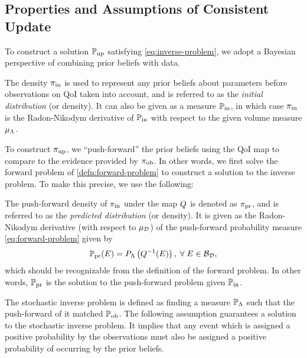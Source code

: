 \subsection{Properties and Assumptions of Consistent Update}\label{sec:properties}

To construct a solution $\operatorname*{\mathbb{P}_{up}}$ satisfying \eqref{eq:inverse-problem}, we adopt a Bayesian perspective of combining prior beliefs with data. 

\begin{defn}\label{defn:initial}
  The density $\operatorname*{\pi_{in}}$ is used to represent any prior beliefs about parameters before observations on QoI taken into account, and is referred to as the \emph{initial distribution} (or density).
  It can also be given as a measure $\operatorname*{\mathbb{P}_{in}}$, in which case $\operatorname*{\pi_{in}}$ is the Radon-Nikodym derivative of $\operatorname*{\mathbb{P}_{in}}$ with respect to the given volume measure $\mu_{{\Lambda}}$. 
\end{defn}

To construct $\operatorname*{\pi_{up}}$, we ``push-forward'' the prior beliefs using the QoI map to compare to the evidence provided by $\operatorname*{\pi_{ob}}$. 
In other words, we first solve the forward problem of \eqref{defn:forward-problem} to construct a solution to the inverse problem. 
To make this precise, we use the following:

\begin{defn}\label{defn:predicted}
  The push-forward density of $\operatorname*{\pi_{in}}$ under the map $Q$ is denoted as $\operatorname*{\pi_{pr}}$, and is referred to as the \emph{predicted distribution} (or density). 
  It is given as the Radon-Nikodym derivative (with respect to $\mu_{\mathcal{D}}$) of the push-forward probability measure \eqref{eq:forward-problem} given by 
  \begin{equation}\label{eq:predicted}
    \operatorname*{\mathbb{P}_{pr}} (E) = P_{\Lambda} \left ( Q^{-1}(E) \right ), \; \forall \; E \in \mathcal{B}_{\mathcal{D}},
  \end{equation}
  which should be recognizable from the definition of the forward problem. 
  In other words, $\operatorname*{\mathbb{P}_{pr}}$ is the solution to the push-forward problem given $\operatorname*{\mathbb{P}_{in}}$.
\end{defn}


The stochastic inverse problem is defined as finding a measure $\mathbb{P}_{\Lambda}$ such that the push-forward of it matched $\operatorname*{\mathbb{P}_{ob}}$.
The following assumption guarantees a solution to the stochastic inverse problem. 
It implies that any event which is assigned a positive probability by the observations must also be assigned a positive probability of occurring by the prior beliefs. 

